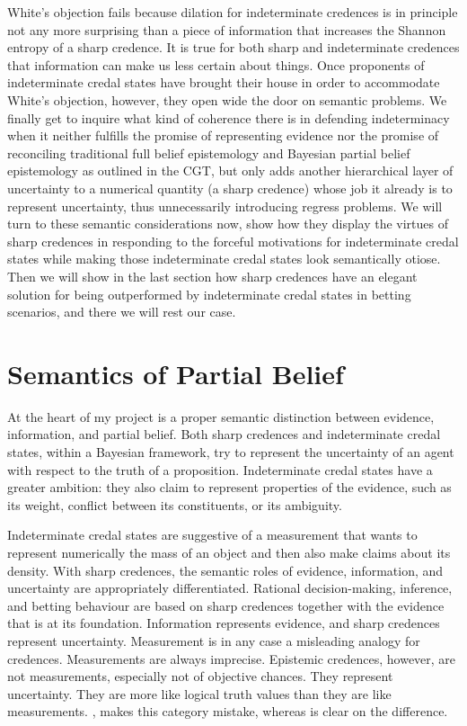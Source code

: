 White's objection fails because dilation for indeterminate credences is in principle not any more surprising than a piece of information that increases the Shannon entropy of a sharp credence. It is true for both sharp and indeterminate credences that information can make us less certain about things. Once proponents of indeterminate credal states have brought their house in order to accommodate White's objection, however, they open wide the door on semantic problems. We finally get to inquire what kind of coherence there is in defending indeterminacy when it neither fulfills the promise of representing evidence nor the promise of reconciling traditional full belief  epistemology and Bayesian partial belief epistemology as outlined in the CGT, but only adds another hierarchical layer of uncertainty to a numerical quantity (a sharp credence) whose job it already is to represent uncertainty, thus unnecessarily introducing regress problems. We will turn to these semantic considerations now, show how they display the virtues of sharp credences in responding to the forceful motivations for indeterminate credal states while making those indeterminate credal states look semantically otiose. Then we will show in the last section how sharp credences have an elegant solution for being outperformed by indeterminate credal states in betting scenarios, and there we will rest our case.

\section{Semantics of Partial Belief}
\label{SemanticsOfPartialBelief}

At the heart of my project is a proper semantic distinction between evidence, information, and partial belief. Both sharp credences and indeterminate credal states, within a Bayesian framework, try to represent the uncertainty of an agent with respect to the truth of a proposition. Indeterminate credal states have a greater ambition: they also claim to represent properties of the evidence, such as its weight, conflict between its constituents, or its ambiguity.

Indeterminate credal states are suggestive of a measurement that wants to represent numerically the mass of an object and then also make claims about its density. With sharp credences, the semantic roles of evidence, information, and uncertainty are appropriately differentiated. Rational decision-making, inference, and betting behaviour are based on sharp credences together with the evidence that is at its foundation. Information represents evidence, and sharp credences represent uncertainty. Measurement is in any case a misleading analogy for credences. Measurements are always imprecise. Epistemic credences, however, are not measurements, especially not of objective chances. They represent uncertainty. They are more like logical truth values than they are like measurements. , makes this category mistake, whereas  is clear on the difference.

